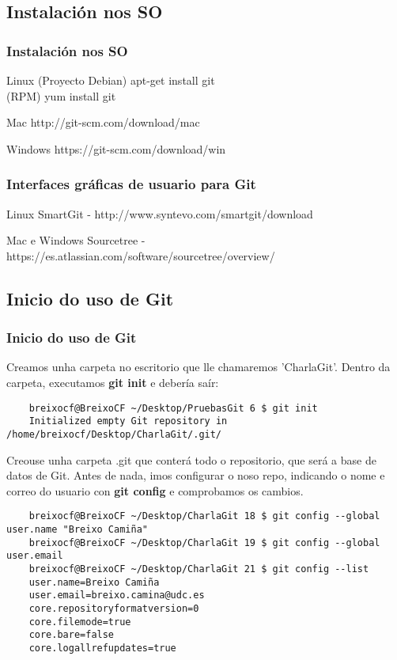 \subsection{Instalación nos SO}
\begin{frame}
  \frametitle{Instalación nos SO}
  \begin{exampleblock}{Linux}
    (Proyecto Debian) apt-get install git\\
    (RPM) yum install git
  \end{exampleblock}
  \begin{block}{Mac}
    http://git-scm.com/download/mac
  \end{block}
  \begin{alertblock}{Windows}
    https://git-scm.com/download/win
  \end{alertblock}	
\end{frame}

\begin{frame}
  \frametitle{Interfaces gráficas de usuario para Git}
  \begin{exampleblock}{Linux}
    SmartGit - http://www.syntevo.com/smartgit/download
  \end{exampleblock}
  \begin{alertblock}{Mac e Windows}
    Sourcetree - https://es.atlassian.com/software/sourcetree/overview/
  \end{alertblock}
\end{frame}

\subsection{Inicio do uso de Git}
\begin{frame}[fragile]
  \frametitle{Inicio do uso de Git}
  \small
  Creamos unha carpeta no escritorio que lle chamaremos 'CharlaGit'.
  Dentro da carpeta, executamos \textbf{git init} e debería saír:
  \tiny
\begin{verbatim}
	breixocf@BreixoCF ~/Desktop/PruebasGit 6 $ git init 
	Initialized empty Git repository in /home/breixocf/Desktop/CharlaGit/.git/
\end{verbatim}
  \small
  Creouse unha carpeta .git que conterá todo o repositorio, que será a base de datos de Git.
  Antes de nada, imos configurar o noso repo, indicando o nome e correo do usuario con \textbf{git config}  e comprobamos os cambios.
  \tiny
\begin{verbatim}
	breixocf@BreixoCF ~/Desktop/CharlaGit 18 $ git config --global user.name "Breixo Camiña"
	breixocf@BreixoCF ~/Desktop/CharlaGit 19 $ git config --global user.email 
	breixocf@BreixoCF ~/Desktop/CharlaGit 21 $ git config --list 
	user.name=Breixo Camiña
	user.email=breixo.camina@udc.es
	core.repositoryformatversion=0
	core.filemode=true
	core.bare=false
	core.logallrefupdates=true
\end{verbatim}	
\end{frame}

